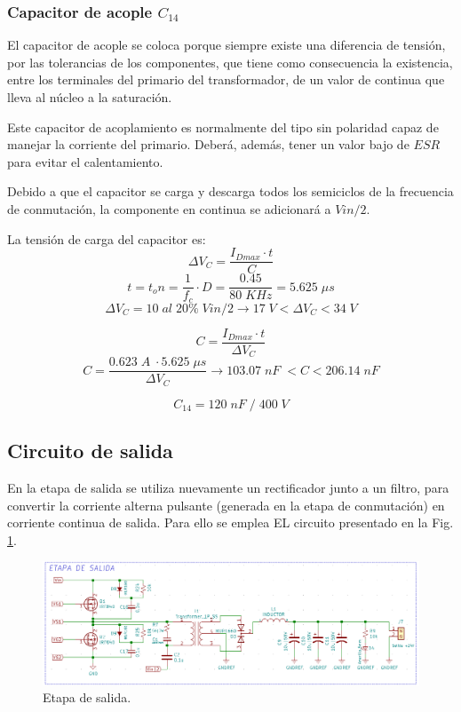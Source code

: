 \documentclass[11pt, a4paper]{article}
\begin{document}
\subsubsection{Capacitor de acople $C_{14}$}
El capacitor de acople se coloca porque siempre existe una diferencia de tensión, por las tolerancias de los componentes, que tiene como consecuencia la existencia, entre los terminales del primario del transformador, de un valor de continua que lleva al núcleo a la saturación. 

Este capacitor de acoplamiento es normalmente del tipo sin polaridad capaz de manejar la corriente del primario. Deberá, además, tener un valor bajo de $ESR$ para evitar el calentamiento.

Debido a que el capacitor se carga y descarga todos los semiciclos de la frecuencia de conmutación, la componente en continua se adicionará a $Vin / 2$.

La tensión de carga del capacitor es:
\begin{equation}
\Delta V_C = \frac{I_{Dmax} \cdot t}{C}
\label{VC}
\end{equation}
\[ t = t_on = \frac{1}{f_c} \cdot D = \frac{0.45}{80 \; KHz} = 5.625 \; \mu s \]
\[ \Delta V_C = 10 \; al \; 20 \% \; Vin / 2 \rightarrow 17 \; V < \Delta V_C < 34 \; V \]

\begin{equation}
C =  \frac{I_{Dmax} \cdot t}{\Delta V_C}
\label{C}
\end{equation}
\[ C =  \frac{0.623 \; A \; \cdot 5.625 \; \mu s}{\Delta V_C} \rightarrow 103.07 \; nF \; < C < 206.14 \; nF \]

\[ C_{14} = 120 \; nF \; / \; 400 \; V \]

\subsection{Circuito de salida}
En la etapa de salida se utiliza nuevamente un rectificador junto a un
filtro, para convertir la corriente alterna pulsante (generada en la etapa de conmutación) en corriente continua de salida. Para ello se emplea EL circuito presentado en la Fig. \ref{salida}.

\begin{figure}[h]
	\centering
	\includegraphics[width = \textwidth]{Imagenes/trafo_salida}
	\caption{Etapa de salida.}
	\label{salida}
\end{figure}
\end{document}
